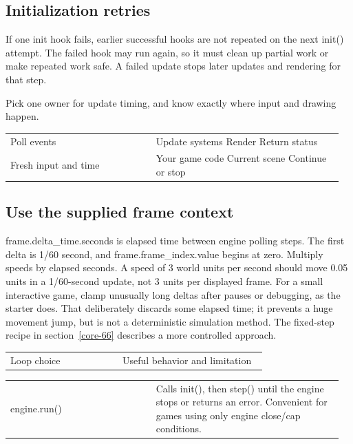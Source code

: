 \documentclass[11pt,a4paper]{article}
\begin{document}
\subsection*{Initialization retries}
If one init hook fails, earlier successful hooks are not repeated on the next init() attempt. The failed hook may run again, so it must clean up partial work or make repeated work safe. A failed update stops later updates and rendering for that step.

\label{core-57}
Pick one owner for update timing, and know exactly where input and drawing happen.

{\small
\begin{longtable}{@{}p{0.42\linewidth}p{0.54\linewidth}@{}}
Poll events & Update systems                    Render                        Return status \\
Fresh input and time & Your game code                 Current scene                   Continue or stop \\
\end{longtable}
}

\subsection*{Use the supplied frame context}
frame.delta\_time.seconds is elapsed time between engine polling steps. The first delta is 1/60 second, and frame.frame\_index.value begins at zero. Multiply speeds by elapsed seconds. A speed of 3 world units per second should move 0.05 units in a 1/60-second update, not 3 units per displayed frame. For a small interactive game, clamp unusually long deltas after pauses or debugging, as the starter does. That deliberately discards some elapsed time; it prevents a huge movement jump, but is not a deterministic simulation method. The fixed-step recipe in section~\ref{core-66} describes a more controlled approach.

{\small
\begin{longtable}{@{}p{0.42\linewidth}p{0.54\linewidth}@{}}
Loop choice & Useful behavior and limitation \\
\end{longtable}
}

{\small
\begin{longtable}{@{}p{0.42\linewidth}p{0.54\linewidth}@{}}
engine.run() & Calls init(), then step() until the engine stops or returns an error. Convenient for games using only engine close/cap conditions. \\
\end{longtable}
}
\end{document}
